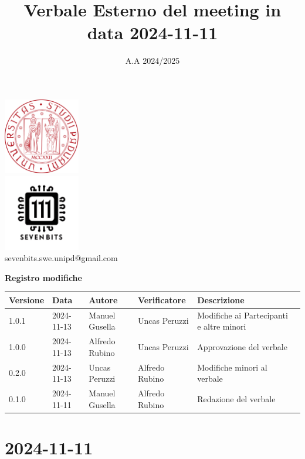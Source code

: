 \documentclass[12pt]{article}
\title{Verbale Esterno del meeting in data 2024-11-11}
\date{A.A 2024/2025}
\begin{document}
\maketitle
\begin{center}
\includegraphics[width=0.25\textwidth]{LogoUnipd}\\
\includegraphics[width=0.25\textwidth]{Sevenbitslogo}\\
sevenbits.swe.unipd@gmail.com\\
\vspace{2mm}

\textbf{Registro modifiche}\\
\vspace{2mm}
\begin{tabular}{|l|l|l|l|l|l|}
\hline
\textbf{Versione} & \textbf{Data} & \textbf{Autore} & \textbf{Verificatore} & \textbf{Descrizione} \\
\hline
1.0.1 & 2024-11-13 & Manuel Gusella & Uncas Peruzzi & Modifiche ai Partecipanti e altre minori\\
\hline
1.0.0 & 2024-11-13  & Alfredo Rubino & Uncas Peruzzi & Approvazione del verbale\\
\hline
0.2.0 & 2024-11-13 & Uncas Peruzzi & Alfredo Rubino & Modifiche minori al verbale\\
\hline
0.1.0 & 2024-11-11 & Manuel Gusella & Alfredo Rubino & Redazione del verbale\\
\hline


\end{tabular}
\end{center}
\newpage
\tableofcontents
\newpage
\section{2024-11-11}
\end{document}
